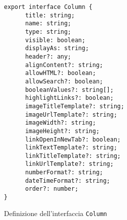 \begin{verbatim}
export interface Column {
      title: string;
      name: string;
      type: string;
      visible: boolean;
      displayAs: string;
      header?: any;
      alignContent?: string;
      allowHTML?: boolean; 
      allowSearch?: boolean;
      booleanValues?: string[];
      highlightLinks?: boolean;
      imageTitleTemplate?: string;
      imageUrlTemplate?: string;
      imageWidth?: string;
      imageHeight?: string;
      linkOpenInNewTab?: boolean;
      linkTextTemplate?: string;
      linkTitleTemplate?: string;
      linkUrlTemplate?: string;
      numberFormat?: string;
      dateTimeFormat?: string;
      order?: number;
}
\end{verbatim}
\begin{listing}[H]
      \caption{Definizione dell'interfaccia \texttt{Column}}
      \label{listing:column}
\end{listing}
